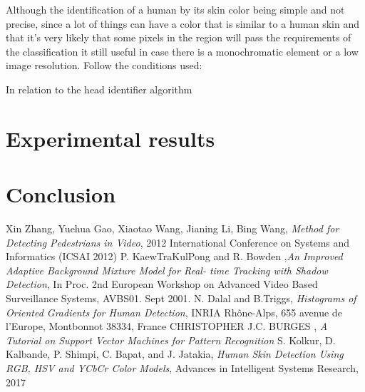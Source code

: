 \documentclass[conference]{IEEEtran}
\begin{document}
	Although the identification of a human by its skin color being simple and not precise, since a lot of things can have a color that is similar to a human skin and that it's very likely that some pixels in the region will pass the requirements of the classification it still useful in case there is a monochromatic element or a low image resolution. Follow the conditions used:
	
	
	
	In relation to the head identifier algorithm 
	
	

\section{Experimental results}

\section{Conclusion}

\begin{thebibliography}{00}
 Xin Zhang, Yuehua Gao, Xiaotao Wang, Jianing Li, Bing Wang, \textit{Method for Detecting Pedestrians in Video}, 2012 International Conference on Systems and Informatics (ICSAI 2012) 
 P. KaewTraKulPong and R. Bowden ,\textit{An Improved Adaptive Background Mixture Model for Real-
time Tracking with Shadow Detection}, In Proc. 2nd European Workshop on Advanced Video Based Surveillance Systems, AVBS01. Sept 2001.
 N. Dalal and B.Triggs, \textit{Histograms of Oriented Gradients for Human Detection}, INRIA Rhône-Alps, 655 avenue de l’Europe, Montbonnot 38334, France 
 CHRISTOPHER J.C. BURGES , \textit{A Tutorial on Support Vector Machines for Pattern Recognition}
 S. Kolkur, D. Kalbande, P. Shimpi, C. Bapat, and J. Jatakia, \textit{Human Skin Detection Using RGB, HSV and YCbCr Color Models}, Advances in Intelligent Systems Research, 2017
\end{thebibliography}
\vspace{12pt}
\end{document}
